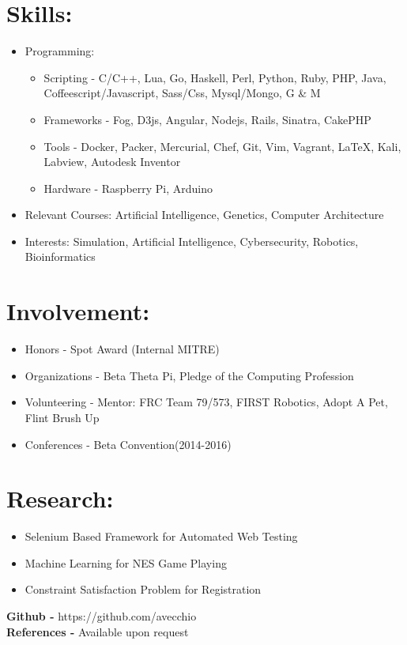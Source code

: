 \documentclass{res}
\begin{document}
\section{Skills:}
\begin{itemize}
\item Programming:
\begin{itemize}[label=$\circ$]
\item Scripting - C/C++, Lua, Go, Haskell, Perl, Python, Ruby, PHP, Java, Coffeescript/Javascript, Sass/Css, Mysql/Mongo, G \& M
\item Frameworks - Fog, D3js, Angular, Nodejs, Rails, Sinatra, CakePHP
\item Tools - Docker, Packer, Mercurial, Chef, Git, Vim, Vagrant, \LaTeX, Kali, Labview, Autodesk Inventor
\item Hardware - Raspberry Pi, Arduino
\end{itemize}
\item Relevant Courses: Artificial Intelligence, Genetics, Computer Architecture
\item Interests: Simulation, Artificial Intelligence, Cybersecurity, Robotics, Bioinformatics
\end{itemize}

\section{Involvement:}
\begin{itemize}
\item Honors - Spot Award (Internal MITRE)
\item Organizations - Beta Theta Pi, Pledge of the Computing Profession
\item Volunteering - Mentor: FRC Team 79/573, FIRST Robotics, Adopt A Pet, Flint Brush Up
\item Conferences - Beta Convention(2014-2016)%
\end{itemize}

\section{Research:}
\begin{itemize}
\item Selenium Based Framework for Automated Web Testing
\item Machine Learning for NES Game Playing
\item Constraint Satisfaction Problem for Registration
\end{itemize}

\begin{center}
\textbf{Github - }https://github.com/avecchio\\
\textbf{References - }Available upon request
\end{center}
\end{document}
